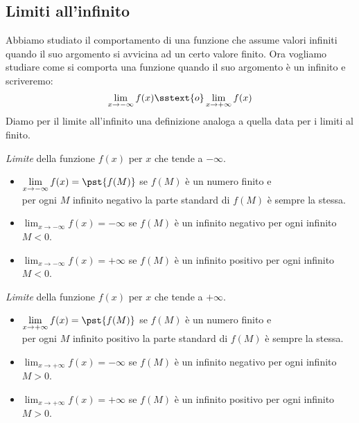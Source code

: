 \subsection{Limiti all'infinito}
\label{subsec:cont_limiti_allinfinito}


Abbiamo studiato il comportamento di una funzione che 
assume valori infiniti quando il suo argomento si avvicina ad un certo 
valore finito. 
Ora vogliamo studiare come si comporta una funzione quando il suo argomento 
è un infinito e scriveremo: 
\[\lim_{x \to -\infty} f(x) \sstext{o} \lim_{x \to +\infty} f(x)\]
Diamo per il limite all'infinito una definizione analoga a quella 
data per i limiti al finito.

\begin{definizione}
\emph{Limite} della funzione \(f(x)\) per \(x\) che tende a \(-\infty\).
\begin{itemize}
\item 
\(\displaystyle \lim_{x \to -\infty}f(x) = \pst{f(M)}\)
se \(f(M)\) è un numero finito e \\
per ogni \(M\) infinito negativo
la parte standard di \(f(M)\) è sempre la stessa.
\item 
\(\displaystyle \lim_{x \to -\infty}f(x) = -\infty\)
se \(f(M)\) è un infinito negativo 
per ogni infinito \(M < 0\).
\item 
\(\displaystyle \lim_{x \to -\infty}f(x) = +\infty\)
se \(f(M)\) è un infinito positivo 
per ogni infinito \(M < 0\).
\end{itemize}
\end{definizione}

\begin{definizione}
\emph{Limite} della funzione \(f(x)\) per \(x\) che tende a \(+\infty\).
\begin{itemize}
\item 
\(\displaystyle \lim_{x \to +\infty}f(x) = \pst{f(M)}\)
se \(f(M)\) è un numero finito e \\
per ogni \(M\) infinito positivo
la parte standard di \(f(M)\) è sempre la stessa.
\item 
\(\displaystyle \lim_{x \to +\infty}f(x) = -\infty\)
se \(f(M)\) è un infinito negativo 
per ogni infinito \(M > 0\).
\item 
\(\displaystyle \lim_{x \to +\infty}f(x) = +\infty\)
se \(f(M)\) è un infinito positivo 
per ogni infinito \(M > 0\).
\end{itemize}
\end{definizione}

